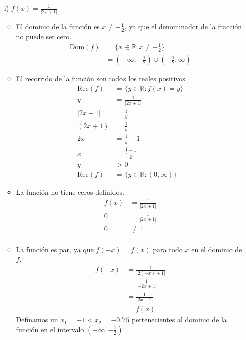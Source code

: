 \documentclass{templateNote}
\begin{document}
\begin{itemize}
    \item[i)] $f(x) = \frac{1}{|2x + 1|}$
    \begin{itemize}
        \item {} El dominio de la función es $x \neq -\frac{1}{2}$, ya que el denominador de la fracción no puede ser cero.
        \begin{align*}
            \text{Dom}(f) &= \{x \in \mathbb{R} : x \neq -\frac{1}{2}\} \\
            &= (-\infty, -\frac{1}{2}) \cup (-\frac{1}{2}, \infty)
        \end{align*}
        \item {} El recorrido de la función son todos los reales positivos.
        \begin{align*}
            \text{Rec}(f) &= \{y \in \mathbb{R} : f(x) = y\} \\
            y &= \frac{1}{|2x + 1|} \\
            |2x + 1| &= \frac{1}{y} \\
            (2x + 1) &= \frac{1}{y} \\
            2x &= \frac{1}{y} - 1 \\
            x &= \frac{\frac{1}{y} - 1}{2} \\
            y &> 0 \\
            \text{Rec}(f) &= \{y \in \mathbb{R} : (0,\infty)\} 
        \end{align*}
        \item {} La función no tiene ceros definidos.
        \begin{align*}
            f(x) &= \frac{1}{|2x + 1|} \\
            0 &= \frac{1}{|2x + 1|} \\
            0 &\neq 1 \\
        \end{align*}
        \item {} La función es par, ya que $f(-x) = f(x)$ para todo $x$ en el dominio de $f$.
        \begin{align*}
            f(-x) &= \frac{1}{|2(-x) + 1|} \\
            &= \frac{1}{|-2x + 1|} \\
            &= \frac{1}{|2x + 1|} \\
            &= f(x)
        \end{align*}
        Definamos un $x_{1}=-1 < x_2=-0.75$ pertenecientes al dominio de la función en el intervalo $(-\infty, -\frac{1}{2})$

\end{itemize}
\end{itemize}
\end{document}
